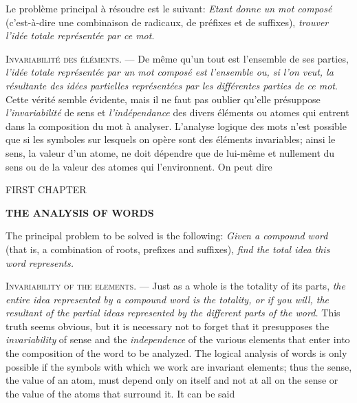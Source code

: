 \begin{sloppypar}
{Le problème principal à résoudre est le suivant: \emph{Etant donne un
  mot composé} (c'est-à-dire une combinaison de radicaux, de préfixes
et de suffixes), \emph{trouver l’idée totale représentée par ce mot}.

\textsc{Invariabilité des éléments}. — De même qu’un tout est
l’ensemble de ses parties, \emph{l’idée totale représentée par un mot
  composé est l’ensemble ou, si l’on veut, la résultante des idées
  partielles représentées par les différentes parties de ce
  mot}. Cette vérité semble évidente, mais il ne faut pas oublier
qu’elle présuppose \emph{l’invariabilité} de sens et
\emph{l’indépendance} des divers éléments ou atomes qui entrent dans
la composition du mot à analyser. L’analyse logique des mots n’est
possible que si les symboles sur lesquels on opère sont des éléments
invariables; ainsi le sens, la valeur d’un atome, ne doit dépendre que
de lui-même et nullement du sens ou de la valeur des atomes qui
l’environnent. On peut dire } %
{\begin{center}{FIRST CHAPTER}
  \end{center}

  \begin{center}{\textbf{THE ANALYSIS OF WORDS}}
  \end{center}

  The principal problem to be solved is the following: \emph{Given a
    compound word} (that is, a combination of roots, prefixes and
  suffixes), \emph{find the total idea this word represents.}

  \textsc{Invariability of the elements.} --- Just as a whole is the
  totality of its parts, \emph{the entire idea represented by a
    compound word is the totality, or if you will, the resultant of
    the partial ideas represented by the different parts of the word.}
  This truth seems obvious, but it is necessary not to forget that it
  presupposes the \emph{invariability} of sense and the
  \emph{independence} of the various elements that enter into the
  composition of the word to be analyzed. The logical analysis of
  words is only possible if the symbols with which we work are
  invariant elements; thus the sense, the value of an atom, must
  depend only on itself and not at all on the sense or the value of
  the atoms that surround it. It can be said }

\end{sloppypar}
